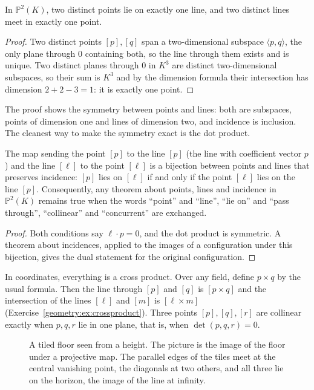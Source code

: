 \begin{proposition}\label{geometry:prop:incidence}
In $\mathbb P^2(K)$, two distinct points lie on exactly one line, and two distinct lines meet in exactly one point.
\end{proposition}

\begin{proof}
Two distinct points $[p],[q]$ span a two-dimensional subspace $\langle p,q\rangle$, the only plane through $0$ containing both, so the line through
them exists and is unique. Two distinct planes through $0$ in $K^3$ are distinct two-dimensional subspaces, so their sum is $K^3$ and by the
dimension formula their intersection has dimension $2+2-3=1$: it is exactly one point.
\end{proof}

The proof shows the symmetry between points and lines: both are subspaces, points of dimension one and lines of dimension two, and incidence is
inclusion. The cleanest way to make the symmetry exact is the dot product.

\begin{theorem}[Duality]\label{geometry:thm:duality}
The map sending the point $[p]$ to the line $[p]$ (the line with coefficient vector $p$) and the line $[\ell]$ to the point $[\ell]$ is a bijection
between points and lines that preserves incidence: $[p]$ lies on $[\ell]$ if and only if the point $[\ell]$ lies on the line $[p]$. Consequently,
any theorem about points, lines and incidence in $\mathbb P^2(K)$ remains true when the words ``point'' and ``line'', ``lie on'' and ``pass
through'', ``collinear'' and ``concurrent'' are exchanged.
\end{theorem}

\begin{proof}
Both conditions say $\ell\cdot p=0$, and the dot product is symmetric. A theorem about incidences, applied to the images of a configuration
under this bijection, gives the dual statement for the original configuration.
\end{proof}

In coordinates, everything is a cross product. Over any field, define $p\times q$ by the usual formula. Then the line through $[p]$ and $[q]$ is
$[p\times q]$ and the intersection of the lines $[\ell]$ and $[m]$ is $[\ell\times m]$ (Exercise~\ref{geometry:ex:crossproduct}). Three points $[p],[q],[r]$
are collinear exactly when $p,q,r$ lie in one plane, that is, when $\det(p,q,r)=0$.

\begin{figure}[ht]
\centering
{}
\caption{A tiled floor seen from a height. The picture is the image of the floor under a projective map. The parallel edges of the tiles
meet at the central vanishing point, the diagonals at two others, and all three lie on the horizon, the image of the line at infinity.}
\label{geometry:fig:floor}
\end{figure}

